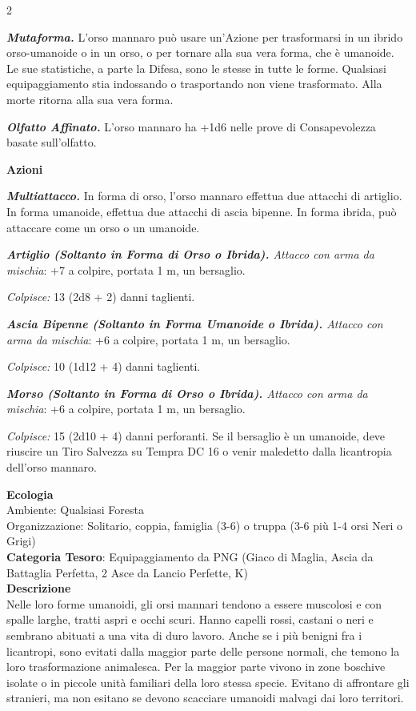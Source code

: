 \begin{multicols}{2}
{\emph{\textbf{Mutaforma.}} L'orso mannaro può usare un'Azione per trasformarsi in un ibrido orso-umanoide o in un orso, o per tornare alla sua vera forma, che è umanoide. Le sue statistiche, a parte la Difesa, sono le stesse in tutte le forme. Qualsiasi equipaggiamento stia indossando o trasportando non viene trasformato. Alla morte ritorna alla sua vera forma.

\emph{\textbf{Olfatto Affinato.}} L'orso mannaro ha +1d6 nelle prove di Consapevolezza basate sull'olfatto.

\textbf{Azioni}

\emph{\textbf{Multiattacco.}} In forma di orso, l'orso mannaro effettua due attacchi di artiglio. In forma umanoide, effettua due attacchi di ascia bipenne. In forma ibrida, può attaccare come un orso o un umanoide.

\emph{\textbf{Artiglio (Soltanto in Forma di Orso o Ibrida).} Attacco con arma da mischia}: +7 a colpire, portata 1 m, un bersaglio.

\emph{Colpisce:} 13 (2d8 + 2) danni taglienti.

\emph{\textbf{Ascia Bipenne (Soltanto in Forma Umanoide o Ibrida).} Attacco con arma da mischia}: +6 a colpire, portata 1 m, un bersaglio.

\emph{Colpisce:} 10 (1d12 + 4) danni taglienti.

\emph{\textbf{Morso (Soltanto in Forma di Orso o Ibrida).} Attacco con arma da mischia}: +6 a colpire, portata 1 m, un bersaglio.

\emph{Colpisce:} 15 (2d10 + 4) danni perforanti. Se il bersaglio è un umanoide, deve riuscire un Tiro Salvezza su Tempra DC 16 o venir maledetto dalla licantropia dell'orso mannaro.

\textbf{Ecologia}\\
Ambiente: Qualsiasi Foresta\\
Organizzazione: Solitario, coppia, famiglia (3-6) o truppa (3-6 più 1-4 orsi Neri o Grigi)\\
\textbf{Categoria Tesoro}: Equipaggiamento da PNG (Giaco di Maglia, Ascia da Battaglia Perfetta, 2 Asce da Lancio Perfette, K)\\
\textbf{Descrizione}\\
Nelle loro forme umanoidi, gli orsi mannari tendono a essere muscolosi e con spalle larghe, tratti aspri e occhi scuri. Hanno capelli rossi, castani o neri e sembrano abituati a una vita di duro lavoro. Anche se i più benigni fra i licantropi, sono evitati dalla maggior parte delle persone normali, che temono la loro trasformazione animalesca. Per la maggior parte vivono in zone boschive isolate o in piccole unità familiari della loro stessa specie. Evitano di affrontare gli stranieri, ma non esitano se devono scacciare umanoidi malvagi dai loro territori.

}
\end{multicols}
